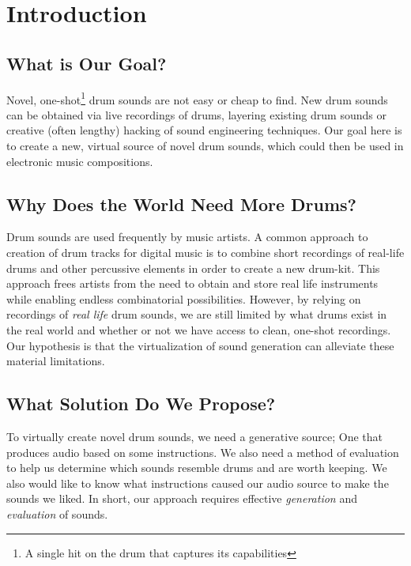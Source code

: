 \documentclass[\main/thesis.tex]{subfiles}
\begin{document}
\chapter{Introduction}

 
\section{What is Our Goal?}
Novel, one-shot\footnote{A single hit on the drum that captures its capabilities} drum sounds are not easy or cheap to find. New drum sounds can be obtained via live recordings of drums, layering existing drum sounds or creative (often lengthy) hacking of sound engineering techniques. Our goal here is to create a new, virtual source of novel drum sounds, which could then be used in electronic music compositions.

\section{Why Does the World Need More Drums?}
 Drum sounds are used frequently by music artists. A common approach to creation of drum tracks for digital music is to combine short recordings of real-life drums and other percussive elements in order to create a new drum-kit. This approach frees artists from the need to obtain and store real life instruments while enabling endless combinatorial possibilities. However, by relying on recordings of \textit{real life} drum sounds, we are still limited by what drums exist in the real world and whether or not we have access to clean, one-shot recordings. Our hypothesis is that the virtualization of sound generation can alleviate these material limitations. 
 
\section{What Solution Do We Propose?}
To virtually create novel drum sounds, we need a generative source; One that produces audio based on some instructions. We also need a method of evaluation to help us determine which sounds resemble drums and are worth keeping. We also would like to know what instructions caused our audio source to make the sounds we liked. In short, our approach requires effective \textit{generation} and \textit{evaluation} of sounds. 
\end{document}
